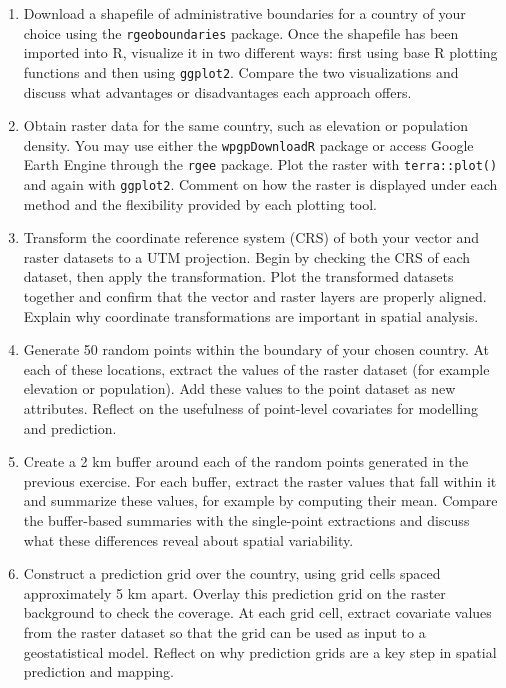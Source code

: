 \documentclass[
  letterpaper,
]{krantz}
\begin{document}
\begin{enumerate}
\def\labelenumi{\arabic{enumi}.}
\item
  Download a shapefile of administrative boundaries for a country of
  your choice using the \texttt{rgeoboundaries} package. Once the
  shapefile has been imported into R, visualize it in two different
  ways: first using base R plotting functions and then using
  \texttt{ggplot2}. Compare the two visualizations and discuss what
  advantages or disadvantages each approach offers.
\item
  Obtain raster data for the same country, such as elevation or
  population density. You may use either the \texttt{wpgpDownloadR}
  package or access Google Earth Engine through the \texttt{rgee}
  package. Plot the raster with \texttt{terra::plot()} and again with
  \texttt{ggplot2}. Comment on how the raster is displayed under each
  method and the flexibility provided by each plotting tool.
\item
  Transform the coordinate reference system (CRS) of both your vector
  and raster datasets to a UTM projection. Begin by checking the CRS of
  each dataset, then apply the transformation. Plot the transformed
  datasets together and confirm that the vector and raster layers are
  properly aligned. Explain why coordinate transformations are important
  in spatial analysis.
\item
  Generate 50 random points within the boundary of your chosen country.
  At each of these locations, extract the values of the raster dataset
  (for example elevation or population). Add these values to the point
  dataset as new attributes. Reflect on the usefulness of point-level
  covariates for modelling and prediction.
\item
  Create a 2 km buffer around each of the random points generated in the
  previous exercise. For each buffer, extract the raster values that
  fall within it and summarize these values, for example by computing
  their mean. Compare the buffer-based summaries with the single-point
  extractions and discuss what these differences reveal about spatial
  variability.
\item
  Construct a prediction grid over the country, using grid cells spaced
  approximately 5 km apart. Overlay this prediction grid on the raster
  background to check the coverage. At each grid cell, extract covariate
  values from the raster dataset so that the grid can be used as input
  to a geostatistical model. Reflect on why prediction grids are a key
  step in spatial prediction and mapping.
\end{enumerate}
\end{document}

